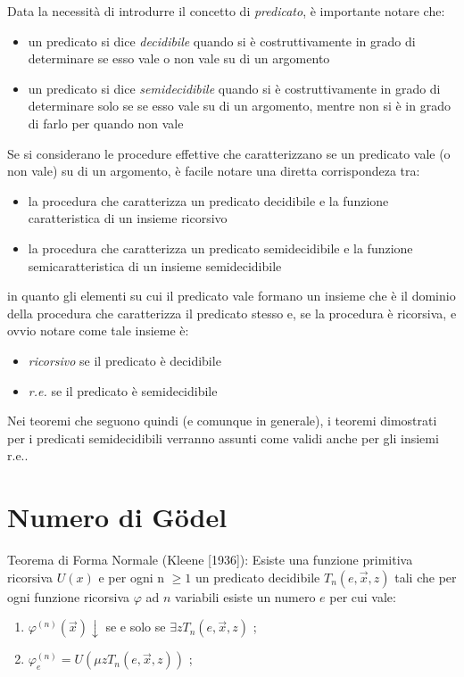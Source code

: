 Data la necessit\`{a} di introdurre il concetto di \textit{predicato}, \`{e} importante notare che:
\begin{itemize}
 \item un predicato si dice \textit{decidibile} quando si \`{e} costruttivamente in grado di determinare se esso vale o non vale su di un argomento
 \item un predicato si dice \textit{semidecidibile} quando si \`{e} costruttivamente in grado di determinare solo se se esso vale su di un argomento, mentre non si \`{e} in grado di farlo per quando non vale
\end{itemize}
Se si considerano le procedure effettive che caratterizzano se un predicato vale (o non vale) su di un argomento, \`{e} facile notare una diretta corrispondeza tra:
\begin{itemize}
 \item la procedura che caratterizza un predicato decidibile e la funzione caratteristica di un insieme ricorsivo
 \item la procedura che caratterizza un predicato semidecidibile e la funzione semicaratteristica di un insieme semidecidibile
\end{itemize}
in quanto gli elementi su cui il predicato vale formano un insieme che \`{e} il dominio della procedura che caratterizza il predicato stesso e, se la procedura è ricorsiva, e ovvio notare come tale insieme \`{e}:
\begin{itemize}
 \item \textit{ricorsivo} se il predicato \`{e} decidibile
 \item \textit{r.e.} se il predicato \`{e} semidecidibile
\end{itemize}
Nei teoremi che seguono quindi (e comunque in generale), i teoremi dimostrati per i predicati semidecidibili verranno assunti come validi anche per gli insiemi r.e..

%
%

\section{Numero di G\"odel}

\begin{thm} Teorema di Forma Normale (Kleene [1936]):
Esiste una funzione primitiva ricorsiva $ U(x)$ e per ogni n $\ge1$ un predicato decidibile $T_{n} \left( e,\overrightarrow{x},z \right)$ tali che per ogni funzione ricorsiva $\varphi$ ad $n$ variabili esiste un numero $e$ per cui vale:
\begin{enumerate}
\item $\varphi^{\left( n \right)} \left( \overrightarrow{x}\right)\downarrow$ se e solo se $\exists z T_{n} \left(  e  , \overrightarrow{x}  , z \right)$  ;
\item $\varphi^{\left( n \right)}_{e} =  U \left( \mu  z   T_{n}\left( e,\overrightarrow{x},z\right) \right)   $ ;
\end{enumerate}
\end{thm}

